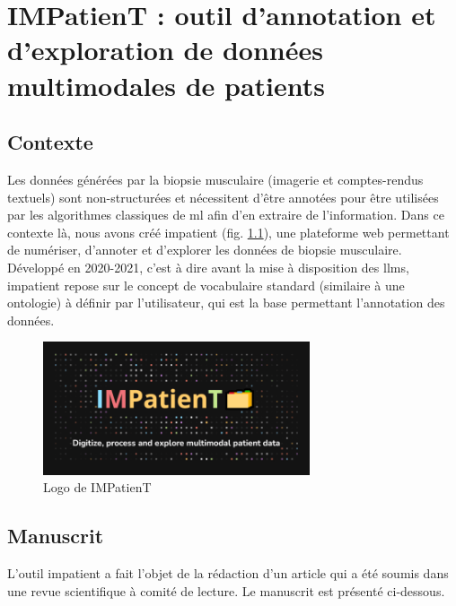 \chapter{IMPatienT : outil d’annotation et d’exploration de données multimodales de patients}

\section{Contexte}
Les données générées par la biopsie musculaire (imagerie et comptes-rendus textuels) sont non-structurées et nécessitent d'être annotées pour être utilisées par les algorithmes classiques de \gls{ml} afin d'en extraire de l'information. Dans ce contexte là, nous avons créé \gls{impatient} (fig. \ref{fig:impatient_logo}), une plateforme web permettant de numériser, d'annoter et d'explorer les données de biopsie musculaire. Développé en 2020-2021, c'est à dire avant la mise à disposition des \gls{llms}, \gls{impatient} repose sur le concept de vocabulaire standard (similaire à une ontologie) à définir par l'utilisateur, qui est la base permettant l'annotation des données.

\begin{figure}[!ht]
  \centering
  \includegraphics[width=0.7\textwidth]{figures/impatient_banner.png}
  \caption[Logo IMPatienT]{Logo de IMPatienT}
  \label{fig:impatient_logo}
\end{figure}


\section{Manuscrit} 
L'outil \gls{impatient} a fait l'objet de la rédaction d'un article qui a été soumis dans une revue scientifique à comité de lecture. Le manuscrit est présenté ci-dessous.


